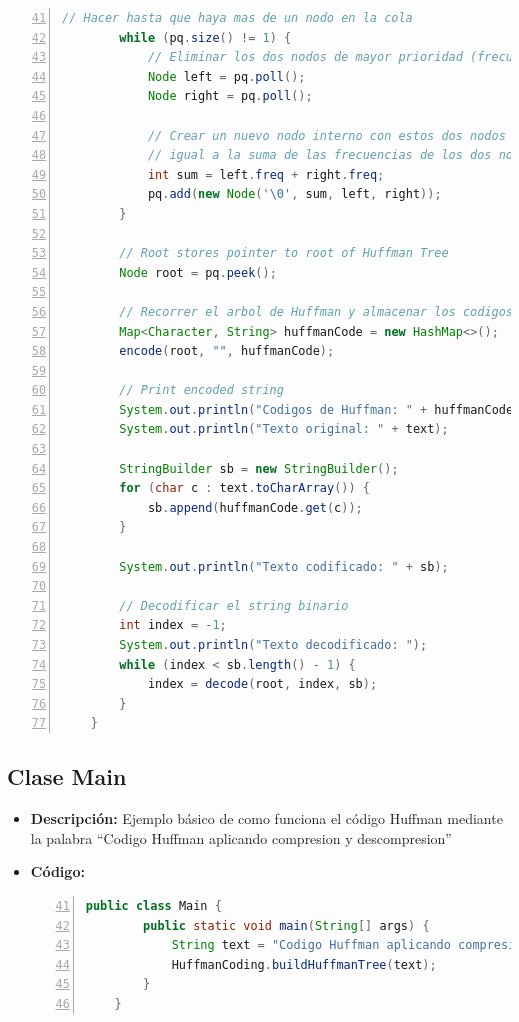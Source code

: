 \documentclass{article}
\begin{document}
\begin{itemize}
\begin{lstlisting}[language=java, numbers=left, firstnumber=41, numberstyle=\color{orange}]
        // Hacer hasta que haya mas de un nodo en la cola
        while (pq.size() != 1) {
            // Eliminar los dos nodos de mayor prioridad (frecuencia minima)
            Node left = pq.poll();
            Node right = pq.poll();

            // Crear un nuevo nodo interno con estos dos nodos como hijos y con una frecuencia
            // igual a la suma de las frecuencias de los dos nodos. Anadir el nuevo nodo a la cola.
            int sum = left.freq + right.freq;
            pq.add(new Node('\0', sum, left, right));
        }

        // Root stores pointer to root of Huffman Tree
        Node root = pq.peek();

        // Recorrer el arbol de Huffman y almacenar los codigos de Huffman en un mapa
        Map<Character, String> huffmanCode = new HashMap<>();
        encode(root, "", huffmanCode);

        // Print encoded string
        System.out.println("Codigos de Huffman: " + huffmanCode);
        System.out.println("Texto original: " + text);

        StringBuilder sb = new StringBuilder();
        for (char c : text.toCharArray()) {
            sb.append(huffmanCode.get(c));
        }

        System.out.println("Texto codificado: " + sb);

        // Decodificar el string binario
        int index = -1;
        System.out.println("Texto decodificado: ");
        while (index < sb.length() - 1) {
            index = decode(root, index, sb);
        }
    }
    \end{lstlisting}
  \end{itemize}
  
  \subsection{Clase Main}
  \begin{itemize}
    \item \textbf{Descripción: }Ejemplo básico de como funciona el código Huffman mediante la palabra “Codigo Huffman 
    aplicando compresion y descompresion”
    \item \textbf{Código: }
    \begin{lstlisting}[language=java, numbers=left, firstnumber=41, numberstyle=\color{orange}]
    public class Main {
        public static void main(String[] args) {
            String text = "Codigo Huffman aplicando compresion y descompresion";
            HuffmanCoding.buildHuffmanTree(text);
        }
    }   
    \end{lstlisting}
  \end{itemize}
\end{document}
